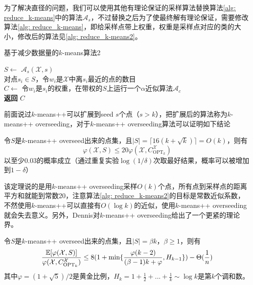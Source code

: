 为了解决直径的问题，我们可以使用其他有理论保证的采样算法替换算法\ref{alg: reduce_k-means}中的算法$\mathcal{A}_s$，不过替换之后为了使最终解有理论保证，需要修改算法\ref{alg: reduce_k-means}，即给采样点带上权重，权重是采样点对应的类的大小，修改后的算法见\ref{alg: reduce_k-means2}。
\begin{algorithm}
    \caption{基于减少数据量的$k$-means算法2}\label{alg: reduce_k-means2}
    $S \gets$ $\mathcal{A}_s(\mathcal{X},s)$ \\
    对点$s_i \in S$，令$w_i$是$\mathcal{X}$中离$s_i$最近的点的数目 \\
    $C \gets$ 令$w_i$是$s_i$的权重，在带权的$S$上运行一个$\alpha$近似算法$\mathcal{A}_c$ \\
    \textbf{返回} $C$
\end{algorithm}
前面说过$k$-means++可以扩展到seed $s$个点（$s>k$），把扩展后的算法称为$k$-means++ overseeding，对于$k$-means++ overseeding算法可以证明如下结论
\begin{theorem}
    \label{theo: k-means++ overseeding1}
    令$S$是$k$-means++ overseed出来的点集，且$|S| = \lceil 16(k+\sqrt{k}) \rceil = O(k)$，则有
    \begin{equation*}
        \varphi(\mathcal{X},S) \leq 20 \varphi(\mathcal{X},C_{\text{OPT}_k}^{\mathcal{X}})
    \end{equation*}
    以至少0.03的概率成立（通过重复实验$\log (1/\delta)$次取最好结果，概率可以被增加到$1-\delta$）
\end{theorem}
该定理说的是用$k$-means++ overseeding采样$O(k)$个点，所有点到采样点的距离平方和就能到常数20，注意算法\ref{alg: reduce_k-means2}的目标是常数近似系数，不然使用$k$-means++可以直接有$O(\log k)$的近似，使用$k$-means++ overseeding就会失去意义。另外，Dennis\cite{wei2016constant}对$k$-means++ overseeding给出了一个更紧的理论界。
\begin{theorem}
    \label{theo: k-means++ overseeding2}
    令$S$是$k$-means++ overseed出来的点集，且$|S| = \beta k$，$\beta \geq 1$，则有
    \begin{equation*}
        \frac{\mathbb{E}[\varphi(\mathcal{X},S)]}{\varphi(\mathcal{X},C_{\text{OPT}_k}^{\mathcal{X}})} \leq 8(1+\min\{\frac{\varphi(k-2)}{(\beta -1)k + \varphi},H_{k-1}\}) - \Theta(\frac{1}{n})
    \end{equation*}
    其中$\varphi = (1+\sqrt{5})/2$是黄金比例，$H_k = 1+\frac{1}{2}+...+\frac{1}{k} \sim \log k$是第$k$个调和数。
\end{theorem}

